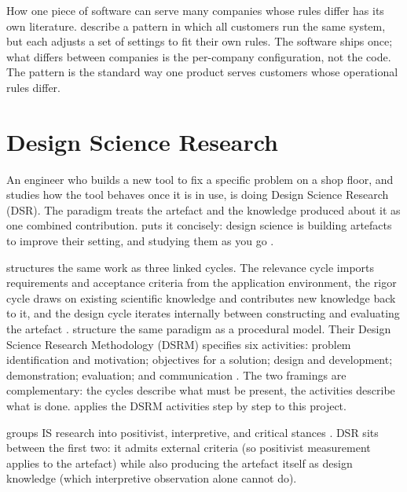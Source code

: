 How one piece of software can serve many companies whose rules differ has its own literature. \textcite{mietzner2009variability} describe a pattern in which all customers run the same system, but each adjusts a set of settings to fit their own rules. The software ships once; what differs between companies is the per-company configuration, not the code. The pattern is the standard way one product serves customers whose operational rules differ.


\section{Design Science Research}
\label{sec:dsr}

An engineer who builds a new tool to fix a specific problem on a shop floor, and studies how the tool behaves once it is in use, is doing Design Science Research (DSR). The paradigm treats the artefact and the knowledge produced about it as one combined contribution. \textcite{wieringa2014dsm} puts it concisely: design science is building artefacts to improve their setting, and studying them as you go \parencite[p.~3]{wieringa2014dsm}.

\textcite{hevner2007threecycle} structures the same work as three linked cycles. The relevance cycle imports requirements and acceptance criteria from the application environment, the rigor cycle draws on existing scientific knowledge and contributes new knowledge back to it, and the design cycle iterates internally between constructing and evaluating the artefact \parencite[pp.~88--90]{hevner2007threecycle}. \textcite{peffers2007dsrm} structure the same paradigm as a procedural model. Their Design Science Research Methodology (DSRM) specifies six activities: problem identification and motivation; objectives for a solution; design and development; demonstration; evaluation; and communication \parencite[p.~46]{peffers2007dsrm}. The two framings are complementary: the cycles describe what must be present, the activities describe what is done.  applies the DSRM activities step by step to this project.

\textcite{orlikowski1991studying} groups IS research into positivist, interpretive, and critical stances \parencite[p.~5]{orlikowski1991studying}. DSR sits between the first two: it admits external criteria (so positivist measurement applies to the artefact) while also producing the artefact itself as design knowledge (which interpretive observation alone cannot do).

